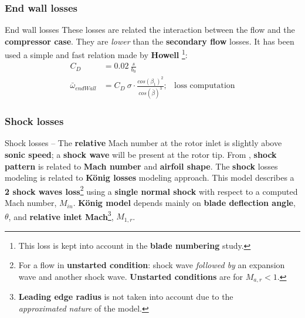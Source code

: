 \subsubsection{End wall losses}
	\begin{frame}{End wall losses}
		These losses are related the interaction between the flow and the \textbf{compressor case}. They are \textit{lower} than the \textbf{secondary flow} losses.
		\newline
		It has been used a simple and fast relation made by \textbf{Howell} \cite[Ch. 6]{axial2004}\footnote{This loss is kept into account in the \textbf{blade numbering} study.}:
		\begin{align}
			C_{D} & = 0.02 \ \frac{s}{b_{0}} \nonumber \\ 
			\bar{\omega}_{endWall} & = C_{D} \ \sigma \cdot \frac{cos( \beta_1 )^2}{cos( \bar{\beta} )^3}; & \text{loss computation} \nonumber 
		\end{align}		
	\end{frame}

\subsubsection{Shock losses}
	\begin{frame}{Shock losses -- }
		The \textbf{relative} Mach number at the rotor inlet is slightly above \textbf{sonic speed}; a \textbf{shock wave} will be present at the rotor tip. From \cite{manfredi2020transonic}, \textbf{shock pattern} is related to \textbf{Mach number} and \textbf{airfoil shape}.
		\newline
		\newline 
		The \textbf{shock} losses modeling is related to \textbf{K\"onig losses} modeling approach. This model describes a \textbf{2 shock waves loss}\footnote{For a flow in \textbf{unstarted condition}: shock wave \textit{followed by} an expansion wave and another shock wave. \textbf{Unstarted conditions} are for $M_{a,r} < 1$.} using a \textbf{single normal shock} with respect to a computed Mach number, $M_{in}$. 
		\newline
		\newline
		\textbf{K\"onig model} depends mainly on \textbf{blade deflection angle}, $\theta$, and \textbf{relative inlet Mach}\footnote{\textbf{Leading edge radius} is not taken into account due to the \\ \textit{approximated nature} of the model.}, $M_{1,r}$.
	\end{frame}
	
